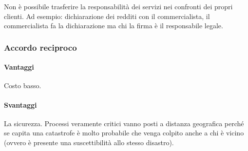 Non è possibile trasferire la responsabilità dei servizi nei confronti dei 
propri clienti. Ad esempio: dichiarazione dei redditi con il commercialista, il 
commercialista fa la dichiarazione ma chi la firma è il responsabile legale.

\subsubsection{Accordo reciproco}

\paragraph*{Vantaggi} Costo basso. 

\paragraph*{Svantaggi}La sicurezza. Processi veramente critici vanno posti a 
distanza geografica perché se capita una catastrofe è molto probabile che venga 
colpito anche a chi è vicino (ovvero è presente una suscettibilità allo stesso 
disastro).
